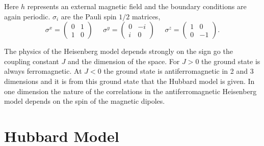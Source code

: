 \documentclass[12pt,a4paper]{article}
\begin{document}
Here $h$ represents an external magnetic field and the boundary conditions are again periodic. $\sigma_i$ are the Pauli spin $1/2$ matrices,
\begin{equation}
\label{eq:PauliMatrixX}
\sigma^x =  
    \begin{pmatrix} 
     0 & 1 \\ 
      1 & 0
    \end{pmatrix} \;\;\;\;\;
    \sigma^y =  
    \begin{pmatrix} 
     0 & -i \\ 
      i & 0
    \end{pmatrix} \;\;\;\;\;
    \sigma^z =  
    \begin{pmatrix} 
     1 & 0 \\ 
     0 & -1
    \end{pmatrix}.
\end{equation}

The physics of the Heisenberg model depends strongly on the sign go the coupling constant $J$ and the dimension of the space. For $J> 0$ the ground state is always ferromagnetic. At $J< 0$ the ground state is antiferromagnetic in 2 and 3 dimensions and it is from this ground state that the Hubbard model is given. In one dimension the nature of the correlations in the antiferromagnetic Heisenberg model depends on the spin of the magnetic dipoles. 

\section{Hubbard Model}




\end{document}
